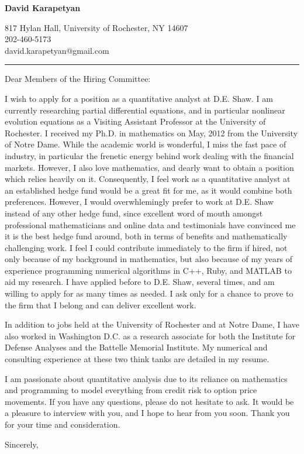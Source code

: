 \documentclass[12pt]{letter}
\date{\vspace{0.5cm}\flushleft}
\begin{document}
\begin{letter}{}
\begin{center}
{\bf {\Large David Karapetyan}}
\end{center}

\begin{center}
{817 Hylan Hall, University of Rochester, NY 14607  \\ 
202-460-5173 \\  david.karapetyan@gmail.com
}
\end{center}
\hrule

\opening{Dear Members of the Hiring Committee:\\}
%

%
I wish to apply for a position as a quantitative analyst at D.E. Shaw. I am currently researching partial differential equations, and in particular nonlinear
evolution equations as a Visiting Assistant Professor at the University of
Rochester. I received my Ph.D. in mathematics on May, 2012 from the University
of Notre Dame. While the academic world is wonderful, I miss the fast pace of
industry, in particular the frenetic energy behind work dealing with the
financial markets. However, I also love mathematics, and dearly want to obtain
a position which relies heavily on it. Consequently, I feel work as a
quantitative analyst at an established hedge fund would be a great fit for me, as it would combine both preferences. However, I would overwhlemingly prefer to work at D.E. Shaw instead of any other hedge fund, since excellent word of mouth amongst professional mathematicians and online data and testimonials have convinced me it
is the best hedge fund around, both in terms of benefits and mathematically challenging work. I feel I could contribute immediately to the
firm if hired, not only because of my background in mathematics, but also
because of my years of experience programming numerical algorithms in C++,
Ruby, and MATLAB to aid my research. I have applied before to D.E. Shaw, several times, and am willing to apply for as many times as needed. I ask only for a chance to prove to the firm that I belong and can deliver excellent work.

In addition to jobs held at the University of Rochester and at Notre Dame, I have
also worked in Washington D.C. as a research associate for both the Institute
for Defense Analyses and the Battelle Memorial Institute. My numerical and
consulting experience at these two think tanks are detailed in my resume. 

I am passionate about quantitative analysis due to its reliance on mathematics and programming to model everything from credit risk to option price movements. If you have any questions, please do not hesitate to ask. It would be a
pleasure to interview with you, and I hope to hear from you soon. Thank you for
your time and consideration. 

\closing{Sincerely,}


\end{letter}
\end{document}
